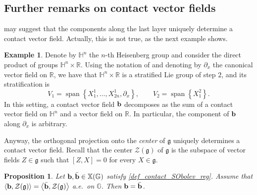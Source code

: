 \documentclass[11pt]{amsart}
\newcommand{\rr}{\mathbb R}
\newcommand{\hh}{{\mathbb{H}}} %
\newcommand{\bb}{{\bf {b}}} %
\DeclareMathOperator{\spann}{span}
\theoremstyle{plain}
\newtheorem{proposition}[theorem]{Proposition}
\theoremstyle{definition}
\newtheorem{example}[theorem]{Example}
\theoremstyle{remark}
\numberwithin{equation}{section}
\begin{document}
\subsection{Further remarks on contact vector fields}
 may suggest that the components along the last layer uniquely determine a contact vector field. Actually, this is not true, as the next example shows.
\begin{example}
Denote by $\hh^n$ the $n$-th Heisenberg group and consider the direct product of groups $\hh^n \times \rr$. Using the notation of  and denoting by $\partial_x$ the canonical vector field on $\rr$, we have that $\hh^n \times \rr$ is a stratified Lie group of step $2$, and its stratification is
\begin{equation*}
V_1=\spann\left\{X^1_1,\dots,X^1_{2n},\partial_x\right\}, \qquad V_2=\spann\left\{X^2_1\right\}.
\end{equation*}
In this setting, a contact vector field $\bb$ decomposes as the sum of a contact vector field on $\hh^n$ and a vector field on $\rr$. In particular, the component of $\bb$ along $\partial_x$ is arbitrary.
\end{example}
Anyway, the orthogonal projection onto the \emph{center} of $\mathfrak{g}$ uniquely determines a contact vector field. Recall that the center $\mathcal{Z}(\mathfrak{g})$ of $\mathfrak{g}$ is the subspace of vector fields $Z \in \mathfrak{g}$ such that $[Z,X]=0$ for every $X \in \mathfrak{g}$.
\begin{proposition}
Let $\bb,\bar{\bb} \in \mathbb{X}(\mathbb{G})$ satisfy \eqref{def_contact_SObolev_reg}. Assume that $\left\langle \bb,\mathcal{Z}(\mathfrak{g})\right\rangle= \left\langle \bar\bb,\mathcal{Z}(\mathfrak{g})\right\rangle$ a.e.~on $\mathbb G$. 
Then $\bb=\bar \bb$.
\end{proposition}
\end{document}
